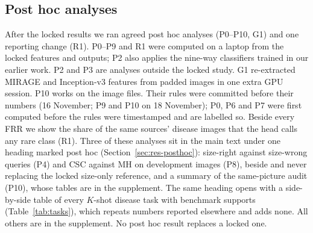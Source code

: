 \documentclass[conference]{IEEEtran}
\begin{document}
\subsection{Post hoc analyses}
\label{sec:posthoc-methods}
After the locked results we ran agreed post hoc analyses (P0--P10, G1) and one reporting change (R1). P0--P9 and R1 were computed on a laptop from the locked features and outputs; P2 also applies the nine-way classifiers trained in our earlier work. P2 and P3 are analyses outside the locked study. G1 re-extracted MIRAGE and Inception-v3 features from padded images in one extra GPU session. P10 works on the image files. Their rules were committed before their numbers (16 November; P9 and P10 on 18 November); P0, P6 and P7 were first computed before the rules were timestamped and are labelled so.
Beside every FRR we show the share of the same sources' disease images that the head calls any rare class (R1). Three of these analyses sit in the main text under one heading marked post hoc (Section~\ref{sec:res-posthoc}): size-right against size-wrong queries (P4) and CSC against MH on development images (P8), beside and never replacing the locked size-only reference, and a summary of the same-picture audit (P10), whose tables are in the supplement. The same heading opens with a side-by-side table of every $K$-shot disease task with benchmark supports (Table~\ref{tab:tasks}), which repeats numbers reported elsewhere and adds none. All others are in the supplement. No post hoc result replaces a locked one.
\end{document}
